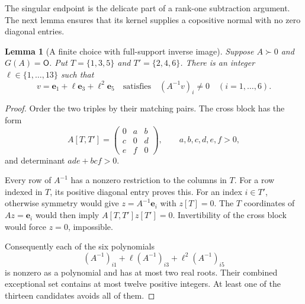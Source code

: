 \documentclass[11pt,a4paper]{article}
\newtheorem{lemma}[theorem]{Lemma}
\theoremstyle{definition}
\newcommand{\OO}{\mathsf{O}}
\newcommand{\ee}{\mathbf e}
\begin{document}
The singular endpoint is the delicate part of a rank-one subtraction argument. The next lemma ensures that its kernel supplies a copositive normal with no zero diagonal entries.

\begin{lemma}[A finite choice with full-support inverse image]\label{lem:generic}
Suppose $A\succ0$ and $G(A)=\OO$. Put $T=\{1,3,5\}$ and $T'=\{2,4,6\}$. There is an integer $\ell\in\{1,\ldots,13\}$ such that
\[
 v=\ee_1+\ell\ee_3+\ell^2\ee_5
 \quad\text{satisfies}\quad (A^{-1}v)_i\ne0\quad(i=1,\ldots,6).
\]
\end{lemma}
\begin{proof}
Order the two triples by their matching pairs. The cross block has the form
\[
 A[T,T']=\begin{pmatrix}0&a&b\\c&0&d\\e&f&0\end{pmatrix},
 \qquad a,b,c,d,e,f>0,
\]
and determinant $ade+bcf>0$.

Every row of $A^{-1}$ has a nonzero restriction to the columns in $T$. For a row indexed in $T$, its positive diagonal entry proves this. For an index $i\in T'$, otherwise symmetry would give $z=A^{-1}\ee_i$ with $z[T]=0$. The $T$ coordinates of $Az=\ee_i$ would then imply $A[T,T']z[T']=0$. Invertibility of the cross block would force $z=0$, impossible.

Consequently each of the six polynomials
\[
 (A^{-1})_{i1}+\ell(A^{-1})_{i3}+\ell^2(A^{-1})_{i5}
\]
is nonzero as a polynomial and has at most two real roots. Their combined exceptional set contains at most twelve positive integers. At least one of the thirteen candidates avoids all of them.
\end{proof}
\end{document}
